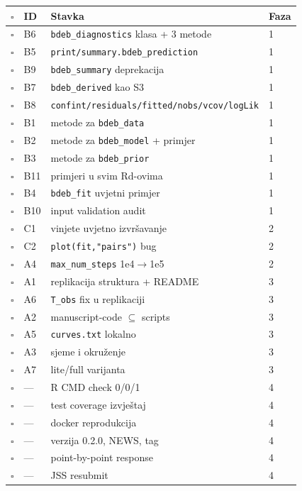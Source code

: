 \documentclass[11pt,a4paper]{article}
\begin{document}
\renewcommand{\arraystretch}{1.15}
\begin{longtable}{@{}p{0.3cm} p{0.7cm} p{12.5cm} p{1.3cm}@{}}
\toprule
$\square$ & \textbf{ID} & \textbf{Stavka} & \textbf{Faza} \\
\midrule
\endhead

$\square$ & B6  & \texttt{bdeb\_diagnostics} klasa + 3 metode & 1 \\
$\square$ & B5  & \texttt{print/summary.bdeb\_prediction}     & 1 \\
$\square$ & B9  & \texttt{bdeb\_summary} deprekacija          & 1 \\
$\square$ & B7  & \texttt{bdeb\_derived} kao S3               & 1 \\
$\square$ & B8  & \texttt{confint/residuals/fitted/nobs/vcov/logLik} & 1 \\
$\square$ & B1  & metode za \texttt{bdeb\_data}               & 1 \\
$\square$ & B2  & metode za \texttt{bdeb\_model} + primjer    & 1 \\
$\square$ & B3  & metode za \texttt{bdeb\_prior}              & 1 \\
$\square$ & B11 & primjeri u svim Rd-ovima                    & 1 \\
$\square$ & B4  & \texttt{bdeb\_fit} uvjetni primjer          & 1 \\
$\square$ & B10 & input validation audit                      & 1 \\
$\square$ & C1  & vinjete uvjetno izvršavanje                 & 2 \\
$\square$ & C2  & \texttt{plot(fit,"pairs")} bug              & 2 \\
$\square$ & A4  & \texttt{max\_num\_steps} 1e4$\rightarrow$1e5 & 2 \\
$\square$ & A1  & replikacija struktura + README              & 3 \\
$\square$ & A6  & \texttt{T\_obs} fix u replikaciji           & 3 \\
$\square$ & A2  & manuscript-code $\subseteq$ scripts         & 3 \\
$\square$ & A5  & \texttt{curves.txt} lokalno                 & 3 \\
$\square$ & A3  & sjeme i okruženje                           & 3 \\
$\square$ & A7  & lite/full varijanta                         & 3 \\
$\square$ & ---  & R CMD check 0/0/1                           & 4 \\
$\square$ & ---  & test coverage izvještaj                     & 4 \\
$\square$ & ---  & docker reprodukcija                          & 4 \\
$\square$ & ---  & verzija 0.2.0, NEWS, tag                    & 4 \\
$\square$ & ---  & point-by-point response                     & 4 \\
$\square$ & ---  & JSS resubmit                                & 4 \\

\bottomrule
\end{longtable}
\end{document}
